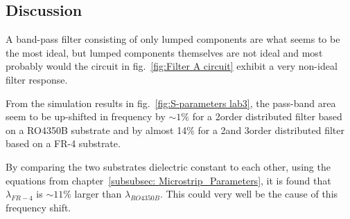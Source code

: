 \documentclass[report.tex]{subfiles}
\begin{document}
\subsection{Discussion}

A band-pass filter consisting of only lumped components are what seems to be the most ideal, but lumped components themselves are not ideal and most probably would the circuit in fig.~\ref{fig:Filter A circuit} exhibit a very non-ideal filter response.

From the simulation results in fig.~\ref{fig:S-parameters lab3}, the pass-band area seem to be up-shifted in frequency by $\sim 1\%$ for a 2\nd order distributed filter based on a RO4350B substrate and by almost 14\% for a 2\nd and 3\rd order distributed filter based on a FR-4 substrate.

By comparing the two substrates dielectric constant to each other, using the equations from chapter~\ref{subsubsec: Microstrip_Parameters}, it is found that $\lambda_{FR-4}$ is $\sim 11\%$ larger than $\lambda_{RO4350B}$. This could very well be the cause of this frequency shift.
\end{document}
